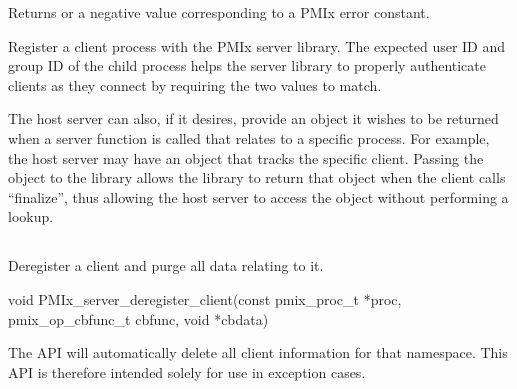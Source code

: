 Returns  or a negative value corresponding to a PMIx error constant.

\descr

Register a client process with the PMIx server library.
The expected user ID and group ID of the child process helps the server library to properly authenticate clients as they connect by requiring the two values to match.

The host server can also, if it desires, provide an object it wishes to be returned when a server function is called that relates to a specific process.
For example, the host server may have an object that tracks the specific client.
Passing the object to the library allows the library to return that object when the client calls ``finalize'', thus allowing the host server to access the object without performing a lookup.


\subsection{}

\summary

Deregister a client and purge all data relating to it.

\format

\cspecificstart
\begin{codepar}
void PMIx_server_deregister_client(const pmix_proc_t *proc,
                                   pmix_op_cbfunc_t cbfunc, void *cbdata)
\end{codepar}
\cspecificend

\begin{arglist}
\end{arglist}


\descr

The  API will automatically delete all client information for that namespace.
This API is therefore intended solely for use in exception cases.


\subsection{}

